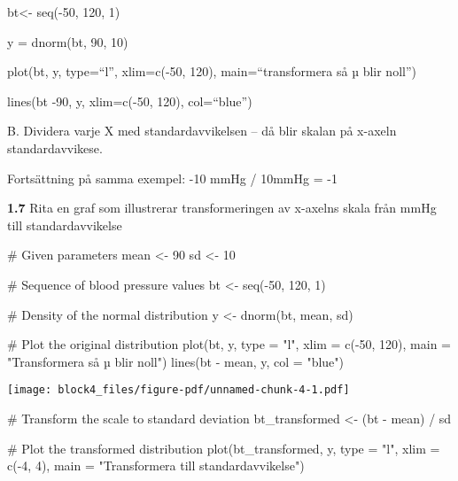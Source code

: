 \documentclass[
  letterpaper,
  DIV=11,
  numbers=noendperiod]{scrartcl}
\newenvironment{Shaded}{\begin{snugshade}}{\end{snugshade}}
\newcommand{\AttributeTok}[1]{\textcolor[rgb]{0.40,0.45,0.13}{#1}}
\newcommand{\CommentTok}[1]{\textcolor[rgb]{0.37,0.37,0.37}{#1}}
\newcommand{\DecValTok}[1]{\textcolor[rgb]{0.68,0.00,0.00}{#1}}
\newcommand{\FunctionTok}[1]{\textcolor[rgb]{0.28,0.35,0.67}{#1}}
\newcommand{\NormalTok}[1]{\textcolor[rgb]{0.00,0.23,0.31}{#1}}
\newcommand{\OtherTok}[1]{\textcolor[rgb]{0.00,0.23,0.31}{#1}}
\newcommand{\SpecialCharTok}[1]{\textcolor[rgb]{0.37,0.37,0.37}{#1}}
\newcommand{\StringTok}[1]{\textcolor[rgb]{0.13,0.47,0.30}{#1}}
\begin{document}
bt\textless- seq(-50, 120, 1)

y = dnorm(bt, 90, 10)

plot(bt, y, type=``l'', xlim=c(-50, 120), main=``transformera så µ blir
noll'')

lines(bt -90, y, xlim=c(-50, 120), col=``blue'')

B. Dividera varje X med standardavvikelsen -- då blir skalan på x-axeln
standardavvikese.

Fortsättning på samma exempel: -10 mmHg / 10mmHg = -1

\textbf{1.7} Rita en graf som illustrerar transformeringen av x-axelns
skala från mmHg till standardavvikelse

\begin{Shaded}
\begin{Highlighting}[]
\CommentTok{\# Given parameters}
\NormalTok{mean }\OtherTok{\textless{}{-}} \DecValTok{90}
\NormalTok{sd }\OtherTok{\textless{}{-}} \DecValTok{10}

\CommentTok{\# Sequence of blood pressure values}
\NormalTok{bt }\OtherTok{\textless{}{-}} \FunctionTok{seq}\NormalTok{(}\SpecialCharTok{{-}}\DecValTok{50}\NormalTok{, }\DecValTok{120}\NormalTok{, }\DecValTok{1}\NormalTok{)}

\CommentTok{\# Density of the normal distribution}
\NormalTok{y }\OtherTok{\textless{}{-}} \FunctionTok{dnorm}\NormalTok{(bt, mean, sd)}

\CommentTok{\# Plot the original distribution}
\FunctionTok{plot}\NormalTok{(bt, y, }\AttributeTok{type =} \StringTok{"l"}\NormalTok{, }\AttributeTok{xlim =} \FunctionTok{c}\NormalTok{(}\SpecialCharTok{{-}}\DecValTok{50}\NormalTok{, }\DecValTok{120}\NormalTok{), }\AttributeTok{main =} \StringTok{"Transformera så µ blir noll"}\NormalTok{)}
\FunctionTok{lines}\NormalTok{(bt }\SpecialCharTok{{-}}\NormalTok{ mean, y, }\AttributeTok{col =} \StringTok{"blue"}\NormalTok{)}
\end{Highlighting}
\end{Shaded}

\texttt{[image: block4\_files/figure-pdf/unnamed-chunk-4-1.pdf]}

\begin{Shaded}
\begin{Highlighting}[]
\CommentTok{\# Transform the scale to standard deviation}
\NormalTok{bt\_transformed }\OtherTok{\textless{}{-}}\NormalTok{ (bt }\SpecialCharTok{{-}}\NormalTok{ mean) }\SpecialCharTok{/}\NormalTok{ sd}

\CommentTok{\# Plot the transformed distribution}
\FunctionTok{plot}\NormalTok{(bt\_transformed, y, }\AttributeTok{type =} \StringTok{"l"}\NormalTok{, }\AttributeTok{xlim =} \FunctionTok{c}\NormalTok{(}\SpecialCharTok{{-}}\DecValTok{4}\NormalTok{, }\DecValTok{4}\NormalTok{), }\AttributeTok{main =} \StringTok{"Transformera till standardavvikelse"}\NormalTok{)}
\end{Highlighting}
\end{Shaded}
\end{document}
